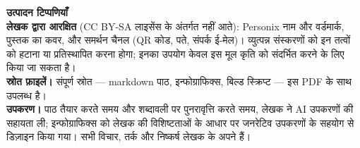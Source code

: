 \clearpage
\thispagestyle{empty}
\begin{flushleft}\small\sffamily
\textbf{उत्पादन टिप्पणियाँ}\\[1.2em]

\textbf{लेखक द्वारा आरक्षित} (CC BY-SA लाइसेंस के अंतर्गत नहीं आते): Personix नाम
और वर्डमार्क, पुस्तक का कवर, और समर्थन चैनल (QR कोड, पते, संपर्क ई-मेल)। व्युत्पन्न
संस्करणों को इन तत्वों को हटाना या प्रतिस्थापित करना होगा; इनका उपयोग केवल इस मूल
कृति को संदर्भित करने के लिए किया जा सकता है।\\[1.2em]

\textbf{स्रोत फ़ाइलें।} संपूर्ण स्रोत --- markdown पाठ, इन्फोग्राफिक्स,
बिल्ड स्क्रिप्ट --- इस PDF के साथ उपलब्ध है।\\[1.2em]

\textbf{उपकरण।} पाठ तैयार करते समय और शब्दावली पर पुनरावृत्ति करते समय, लेखक ने
AI उपकरणों की सहायता ली; इन्फोग्राफिक्स को लेखक की विशिष्टताओं के आधार पर जनरेटिव
उपकरणों के सहयोग से डिज़ाइन किया गया। सभी विचार, तर्क और निष्कर्ष लेखक के अपने हैं।
\end{flushleft}
\clearpage
